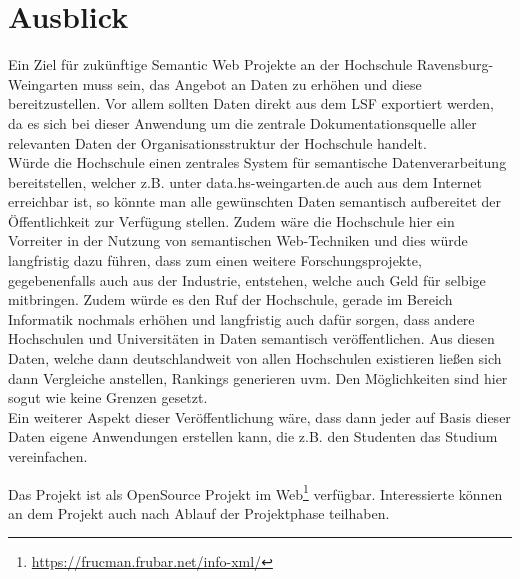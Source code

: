 \section{Ausblick}
\label{sec-ausblick}
Ein Ziel für zukünftige Semantic Web Projekte an der Hochschule Ravensburg-Weingarten muss sein, das Angebot an Daten zu erhöhen und diese bereitzustellen. Vor allem sollten Daten direkt aus dem LSF exportiert werden, da es sich bei dieser Anwendung um die zentrale Dokumentationsquelle aller relevanten Daten der Organisationsstruktur der Hochschule handelt.\\
Würde die Hochschule einen zentrales System für semantische Datenverarbeitung bereitstellen, welcher z.B. unter data.hs-weingarten.de auch aus dem Internet erreichbar ist, so könnte man alle gewünschten Daten semantisch aufbereitet der Öffentlichkeit zur Verfügung stellen. Zudem wäre die Hochschule hier ein Vorreiter in der Nutzung von semantischen Web-Techniken und dies würde langfristig dazu führen, dass zum einen weitere Forschungsprojekte, gegebenenfalls auch aus der Industrie, entstehen, welche auch Geld für selbige mitbringen. Zudem würde es den Ruf der Hochschule, gerade im Bereich Informatik nochmals erhöhen und langfristig auch dafür sorgen, dass andere Hochschulen und Universitäten in Daten semantisch veröffentlichen. Aus diesen Daten, welche dann deutschlandweit von allen Hochschulen existieren ließen sich dann Vergleiche anstellen, Rankings generieren uvm. Den Möglichkeiten sind hier sogut wie keine Grenzen gesetzt.\\
Ein weiterer Aspekt dieser Veröffentlichung wäre, dass dann jeder auf Basis dieser Daten eigene Anwendungen erstellen kann, die z.B. den Studenten das Studium vereinfachen.

Das Projekt ist als OpenSource Projekt im Web\footnote{\url{https://frucman.frubar.net/info-xml/}} verfügbar. Interessierte können an dem Projekt auch nach Ablauf der Projektphase teilhaben.


